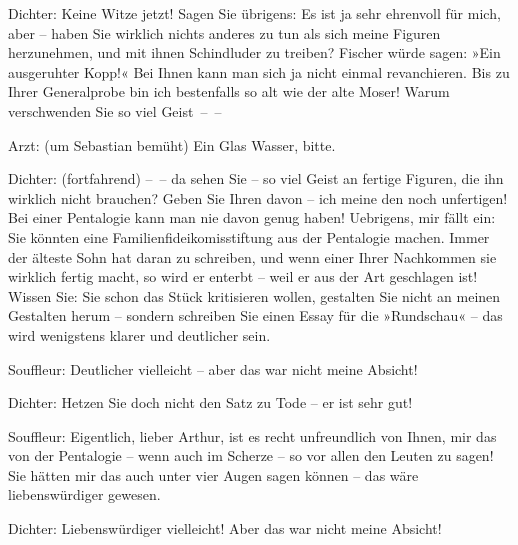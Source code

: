 \pstart
           Dichter: Keine Witze jetzt! Sagen Sie übrigens: Es ist ja sehr ehrenvoll für mich,
               aber – haben Sie wirklich nichts anderes zu tun als sich meine Figuren herzunehmen,
               und mit ihnen Schindluder zu treiben? Fischer
               würde sagen: »Ein ausgeruhter Kopp!« Bei Ihnen kann man sich ja nicht einmal
               revanchieren. Bis zu Ihrer Generalprobe bin ich bestenfalls so alt wie der alte
               Moser! Warum verschwenden Sie so viel Geist – –\pend
           
\pstart
           Arzt: (um Sebastian bemüht) Ein Glas Wasser, bitte.\pend
           
\pstart
           Dichter: (fortfahrend) – – da sehen Sie – so viel Geist an fertige Figuren, die ihn
               wirklich nicht brauchen? Geben Sie Ihren davon – ich meine den noch unfertigen! Bei
               einer Pentalogie kann man nie davon genug haben! Uebrigens, mir fällt ein: Sie
               könnten eine Familienfideikomisstiftung aus der Pentalogie machen. Immer der älteste Sohn hat daran zu schreiben, und wenn einer
               Ihrer Nachkommen sie wirklich fertig macht, so wird{ }{\pb}er enterbt – weil er aus der Art
               geschlagen ist! Wissen Sie:  Sie schon das Stück
               kritisieren wollen, gestalten Sie nicht an meinen Gestalten herum – sondern schreiben
               Sie einen Essay für die »Rundschau« – das wird
               wenigstens klarer und deutlicher sein.\pend
           
\pstart
           Souffleur: Deutlicher vielleicht – aber das war nicht meine Absicht!\pend
           
\pstart
           Dichter: Hetzen Sie doch nicht den Satz zu Tode – er ist sehr gut!\pend
           
\pstart
           Souffleur: Eigentlich, lieber Arthur, ist es recht unfreundlich von Ihnen, mir das
               von der Pentalogie – wenn auch im Scherze – so vor allen den Leuten zu sagen! Sie
               hätten mir das auch unter vier Augen sagen können – das wäre liebenswürdiger
               gewesen.\pend
           
\pstart
           Dichter: Liebenswürdiger vielleicht! Aber das war nicht meine Absicht!\pend
           
